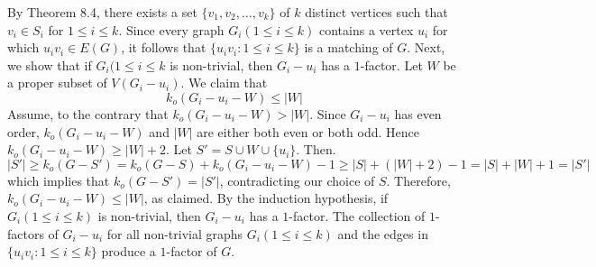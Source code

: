 \vskip 1mm
By Theorem 8.4, there exists a set $\lbrace v_1,v_2, \ldots ,v_k \rbrace$ of $k$ distinct vertices such that $v_i \in S_i$ for $1 \leq i \leq k$. Since every graph $G_i(1 \leq i \leq k)$ contains a vertex $u_i$ for which $u_iv_i \in E(G)$, it follows that $\lbrace u_iv_i:1 \leq i \leq k \rbrace$ is a matching of $G$.
\vskip 1mm
Next, we show that if $G_i(1 \leq i \leq k$ is non-trivial, then $G_i-u_i$ has a $1$-factor. Let $W$ be a proper subset of $V(G_i-u_i)$. We claim that $$k_o(G_i-u_i-W) \leq |W|$$ Assume, to the contrary that $k_o(G_i-u_i-W) > |W|$. Since $G_i-u_i$ has even order, $k_o(G_i-u_i-W)$ and $|W|$ are either both even or both odd. Hence $k_o(G_i-u_i-W) \geq |W|+2$. Let $S'=S \cup W \cup \lbrace u_i \rbrace$. Then.$$|S'| \geq k_o(G-S')=k_o(G-S)+k_o(G_i-u_i-W)-1 \geq |S|+(|W|+2)-1=|S|+|W|+1=|S'|$$ which implies that $k_o(G-S')=|S'|$, contradicting our choice of $S$. Therefore, $k_o(G_i-u_i-W) \leq |W|$, as claimed.
\vskip 1mm
By the induction hypothesis, if $G_i(1 \leq i \leq k)$ is non-trivial, then $G_i-u_i$ has a $1$-factor. The collection of $1$-factors of $G_i-u_i$ for all non-trivial graphs $G_i(1 \leq i \leq k)$ and the edges in $\lbrace u_iv_i: 1 \leq i \leq k \rbrace$ produce a $1$-factor of $G$.

\vfill\eject
